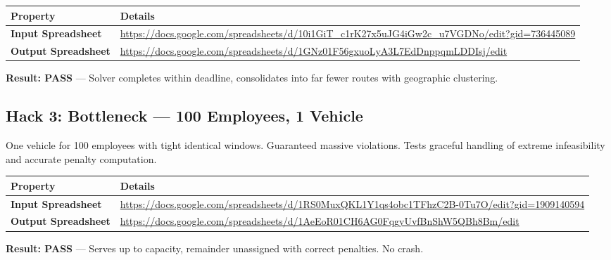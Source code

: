 \documentclass[11pt,a4paper]{article}
\begin{document}
\begin{table}[H]
\centering
\small
\begin{tabular}{p{3.5cm}p{10cm}}
\toprule
\textbf{Property} & \textbf{Details} \\
\midrule
\rowcolor{rowalt}
\textbf{Input Spreadsheet} & \scriptsize\url{https://docs.google.com/spreadsheets/d/10i1GiT_c1rK27x5uJG4iGw2c_u7VGDNo/edit?gid=736445089} \\
\textbf{Output Spreadsheet} & \scriptsize\url{https://docs.google.com/spreadsheets/d/1GNz01F56gxuoLyA3L7EdDnppqmLDDIsj/edit} \\
\bottomrule
\end{tabular}
\end{table}

\begin{resultbox}
\textbf{Result: \textcolor{velgreen}{PASS}} --- Solver completes within deadline, consolidates into far fewer routes with geographic clustering.
\end{resultbox}

\subsection{Hack 3: Bottleneck --- 100 Employees, 1 Vehicle}

\begin{hackbox}
One vehicle for 100 employees with tight identical windows. Guaranteed massive violations. Tests graceful handling of extreme infeasibility and accurate penalty computation.
\end{hackbox}

\begin{table}[H]
\centering
\small
\begin{tabular}{p{3.5cm}p{10cm}}
\toprule
\textbf{Property} & \textbf{Details} \\
\midrule
\rowcolor{rowalt}
\textbf{Input Spreadsheet} & \scriptsize\url{https://docs.google.com/spreadsheets/d/1RS0MuxQKL1Y1qs4obc1TFhzC2B-0Tu7O/edit?gid=1909140594} \\
\textbf{Output Spreadsheet} & \scriptsize\url{https://docs.google.com/spreadsheets/d/1AeEoR01CH6AG0FqgyUvfBnShW5QBh8Bm/edit} \\
\bottomrule
\end{tabular}
\end{table}

\begin{resultbox}
\textbf{Result: \textcolor{velgreen}{PASS}} --- Serves up to capacity, remainder unassigned with correct penalties. No crash.
\end{resultbox}
\end{document}
